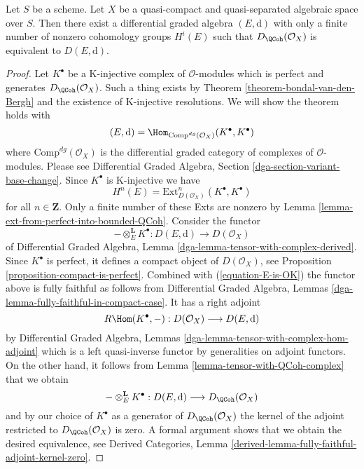 \begin{theorem}
\label{theorem-DQCoh-is-Ddga}
Let $S$ be a scheme.
Let $X$ be a quasi-compact and quasi-separated algebraic space over $S$.
Then there exist a differential graded algebra $(E, \text{d})$
with only a finite number of nonzero cohomology groups $H^i(E)$
such that $D_\QCoh(\mathcal{O}_X)$ is equivalent
to $D(E, \text{d})$.
\end{theorem}

\begin{proof}
Let $K^\bullet$ be a K-injective complex of $\mathcal{O}$-modules which
is perfect and generates $D_\QCoh(\mathcal{O}_X)$. Such a
thing exists by Theorem \ref{theorem-bondal-van-den-Bergh}
and the existence of K-injective resolutions. We will show the
theorem holds with
$$
(E, \text{d}) = \Hom_{\text{Comp}^{dg}(\mathcal{O}_X)}(K^\bullet, K^\bullet)
$$
where $\text{Comp}^{dg}(\mathcal{O}_X)$ is the differential graded category
of complexes of $\mathcal{O}$-modules. Please see
Differential Graded Algebra, Section \ref{dga-section-variant-base-change}.
Since $K^\bullet$ is K-injective we
have
\begin{equation}
\label{equation-E-is-OK}
H^n(E) = \text{Ext}^n_{D(\mathcal{O}_X)}(K^\bullet, K^\bullet)
\end{equation}
for all $n \in \mathbf{Z}$. Only a finite number of these Exts
are nonzero by Lemma \ref{lemma-ext-from-perfect-into-bounded-QCoh}.
Consider the functor
$$
- \otimes_E^\mathbf{L} K^\bullet :
D(E, \text{d}) \longrightarrow D(\mathcal{O}_X)
$$
of
Differential Graded Algebra, Lemma
\ref{dga-lemma-tensor-with-complex-derived}.
Since $K^\bullet$ is perfect, it defines a compact object of
$D(\mathcal{O}_X)$, see Proposition \ref{proposition-compact-is-perfect}.
Combined with (\ref{equation-E-is-OK}) the functor above is fully
faithful as follows from
Differential Graded Algebra, Lemmas
\ref{dga-lemma-fully-faithful-in-compact-case}. It has a right adjoint
$$
R\Hom(K^\bullet, - ) : D(\mathcal{O}_X) \longrightarrow D(E, \text{d})
$$
by Differential Graded Algebra, Lemmas
\ref{dga-lemma-tensor-with-complex-hom-adjoint}
which is a left quasi-inverse functor by generalities on adjoint
functors. On the other hand, it follows from
Lemma \ref{lemma-tensor-with-QCoh-complex} that we obtain
$$
- \otimes_E^\mathbf{L} K^\bullet :
D(E, \text{d}) \longrightarrow D_\QCoh(\mathcal{O}_X)
$$
and by our choice of $K^\bullet$ as a generator of
$D_\QCoh(\mathcal{O}_X)$ the kernel of the adjoint
restricted to $D_\QCoh(\mathcal{O}_X)$ is zero.
A formal argument shows that we obtain the desired equivalence, see
Derived Categories, Lemma
\ref{derived-lemma-fully-faithful-adjoint-kernel-zero}.
\end{proof}










